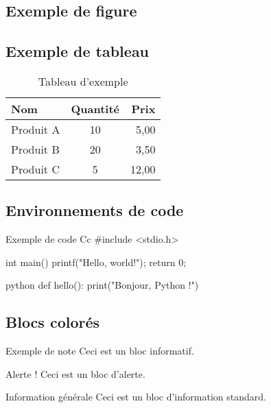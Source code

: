 \documentclass[11pt]{rapport}
\begin{document}
\subsection{Exemple de figure}

\subsection{Exemple de tableau}

\begin{table}[ht]
\centering
\caption{Tableau d'exemple}
\label{tab_exemple}
\begin{tabular}{@{}lcr@{}}
\toprule
Nom & Quantité & Prix \\
\midrule
Produit A & 10 & 5,00 \\
Produit B & 20 & 3,50 \\
Produit C & 5 & 12,00 \\
\bottomrule
\end{tabular}
\end{table}

\subsection{Environnements de code}

\begin{code}{Exemple de code C}{c}
#include <stdio.h>

int main() {
    printf("Hello, world!\n");
    return 0;
}
\end{code}

\begin{codecourt}{python}
def hello():
    print("Bonjour, Python !")
\end{codecourt}

\subsection{Blocs colorés}

\begin{exampleblock}{Exemple de note}
Ceci est un bloc informatif.
\end{exampleblock}

\begin{alertblock}{Alerte !}
Ceci est un bloc d'alerte.
\end{alertblock}

\begin{block}{Information générale}
Ceci est un bloc d'information standard.
\end{block}
\end{document}
